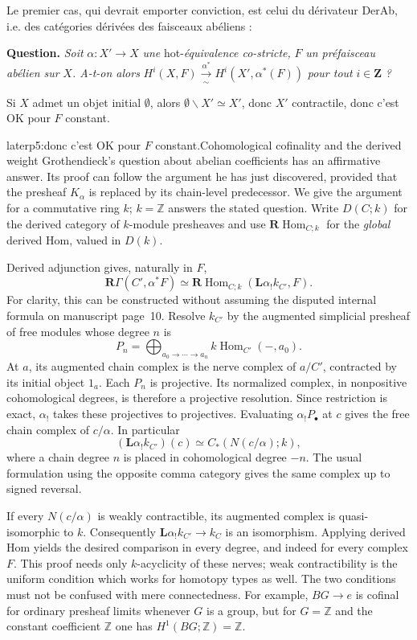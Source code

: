 Le premier cas, qui devrait emporter conviction, est celui du dérivateur DerAb, i.e. des catégories dérivées des faisceaux abéliens :

\textbf{Question.} \textit{Soit} $\alpha : X' \longrightarrow X$ \textit{une} hot-\textit{équivalence co-stricte,} $F$ \textit{un préfaisceau abélien sur} $X$\textit{. A-t-on alors} $H^i(X, F) \xrightarrow[\sim]{\alpha^*} H^i(X', \alpha^*(F))$ \textit{pour tout} $i \in \mathbf{Z}$ \textit{?}

Si $X$ admet un objet initial $\emptyset$, alors $\emptyset\backslash X' \simeq X'$, donc $X'$ contractile, donc c'est OK pour $F$ constant.

\begin{dcomment}{later}{p5:donc c'est OK pour $F$ constant.}{Cohomological cofinality and the derived weight}
Grothendieck's question about abelian coefficients has an affirmative answer. Its proof can follow the argument he has just discovered, provided that the presheaf $K_\alpha$ is replaced by its chain-level predecessor. We give the argument for a commutative ring $k$; $k=\mathbb Z$ answers the stated question. Write $D(C;k)$ for the derived category of $k$-module presheaves and use $\mathbf R\operatorname{Hom}_{C;k}$ for the \emph{global} derived Hom, valued in $D(k)$.

Derived adjunction gives, naturally in $F$,
\[
 \mathbf R\Gamma(C',\alpha^*F)
 \simeq
 \mathbf R\operatorname{Hom}_{C;k}
       (\mathbf L\alpha_!k_{C'},F).
\]
For clarity, this can be constructed without assuming the disputed internal formula on manuscript page~10. Resolve $k_{C'}$ by the augmented simplicial presheaf of free modules whose degree $n$ is
\[
 P_n=\bigoplus_{a_0\to\cdots\to a_n} k\operatorname{Hom}_{C'}(-,a_0).
\]
At $a$, its augmented chain complex is the nerve complex of $a/C'$, contracted by its initial object $1_a$. Each $P_n$ is projective. Its normalized complex, in nonpositive cohomological degrees, is therefore a projective resolution. Since restriction is exact, $\alpha_!$ takes these projectives to projectives. Evaluating $\alpha_!P_\bullet$ at $c$ gives the free chain complex of $c/\alpha$. In particular
\[
 (\mathbf L\alpha_!k_{C'})(c)
 \simeq C_*(N(c/\alpha);k),
\]
where a chain degree $n$ is placed in cohomological degree $-n$. The usual formulation using the opposite comma category gives the same complex up to signed reversal.

If every $N(c/\alpha)$ is weakly contractible, its augmented complex is quasi-isomorphic to $k$. Consequently $\mathbf L\alpha_!k_{C'}\to k_C$ is an isomorphism. Applying derived Hom yields the desired comparison in every degree, and indeed for every complex $F$. This proof needs only $k$-acyclicity of these nerves; weak contractibility is the uniform condition which works for homotopy types as well. The two conditions must not be confused with mere connectedness. For example, $BG\to e$ is cofinal for ordinary presheaf limits whenever $G$ is a group, but for $G=\mathbb Z$ and the constant coefficient $\mathbb Z$ one has $H^1(BG;\mathbb Z)=\mathbb Z$.


\end{dcomment}
